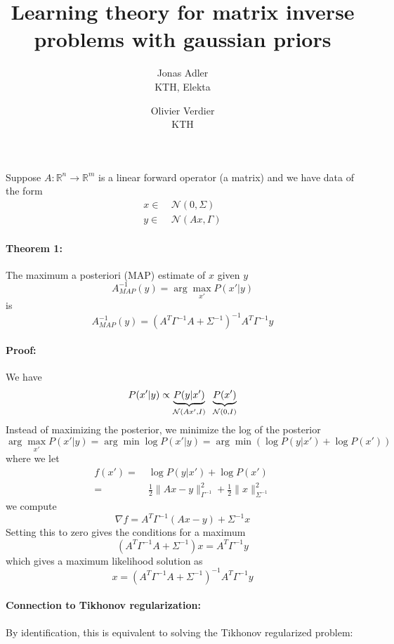 \documentclass[a4paper,10pt]{article}
\title{Learning theory for matrix inverse problems with gaussian priors}
\author{Jonas Adler  \\ {\small KTH, Elekta} \and Olivier Verdier \\ {\small KTH}}
\date{}
\begin{document}
	\maketitle
	
	Suppose $A : \mathbb{R}^n \to \mathbb{R}^m$ is a linear forward operator (a matrix) and we have data of the form
	\begin{align}
		x \in&\ \mathcal{N}(0, \Sigma) \nonumber \\
		y \in&\ \mathcal{N}(Ax, \Gamma) \label{eq:inv_prob}
	\end{align}	
	
	\paragraph{Theorem 1:}
	The maximum a posteriori (MAP) estimate of $x$ given $y$
	\[
	    A^{-1}_{MAP}(y) = \arg\max_{x'} P(x' | y)
	\]
	is
	\[
		A^{-1}_{MAP}(y) = (A^T \Gamma^{-1} A + \Sigma^{-1})^{-1} A^T \Gamma^{-1} y
	\]
	
	\paragraph{Proof:} We have
	\[
		P(x' | y) \propto \underbrace{P(y | x')}_{\mathcal{N}(Ax', I)} \hspace{2mm} \underbrace{P(x')}_{\mathcal{N}(0, I)} 
	\]
	Instead of maximizing the posterior, we minimize the log of the posterior
	\[
		\arg\max_{x'} P(x' | y) = \arg\min \log P(x' | y) = \arg\min \left( \log P(y | x') + \log P(x') \right)
	\]
	where we let
	\begin{align*}
		f(x') =&\ \log P(y | x') + \log P(x') \\
		=&\ \frac{1}{2} \| Ax - y \|_{\Gamma^{-1}}^2 + \frac{1}{2} \| x \|_{\Sigma^{-1}}^2
	\end{align*}
	we compute
	\[
		\nabla f = A^T \Gamma^{-1} (Ax - y) + \Sigma^{-1} x
	\]
	Setting this to zero gives the conditions for a maximum
	\[
		(A^T \Gamma^{-1} A + \Sigma^{-1}) x = A^T \Gamma^{-1} y
	\]
	which gives a maximum likelihood solution as
	\[
		x = (A^T \Gamma^{-1} A + \Sigma^{-1})^{-1} A^T \Gamma^{-1} y
	\]
	
	\paragraph{Connection to Tikhonov regularization:}
	
	By identification, this is equivalent to solving the Tikhonov regularized problem:
	
\end{document}

